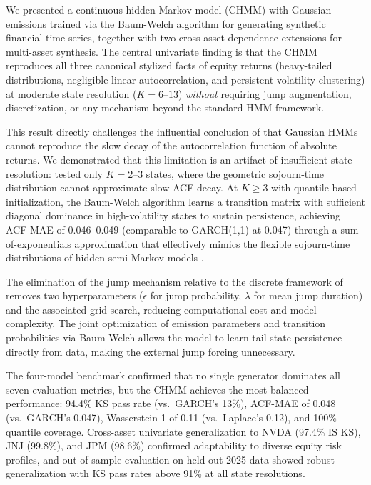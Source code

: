 We presented a continuous hidden Markov model (CHMM) with Gaussian emissions trained via the Baum-Welch algorithm for generating synthetic financial time series, together with two cross-asset dependence extensions for multi-asset synthesis.
The central univariate finding is that the CHMM reproduces all three canonical stylized facts of equity returns (heavy-tailed distributions, negligible linear autocorrelation, and persistent volatility clustering) at moderate state resolution ($K = 6$--$13$) \emph{without} requiring jump augmentation, discretization, or any mechanism beyond the standard HMM framework.

This result directly challenges the influential conclusion of \citet{ryden1998stylized} that Gaussian HMMs cannot reproduce the slow decay of the autocorrelation function of absolute returns.
We demonstrated that this limitation is an artifact of insufficient state resolution: \citet{ryden1998stylized} tested only $K = 2$--$3$ states, where the geometric sojourn-time distribution cannot approximate slow ACF decay.
At $K \geq 3$ with quantile-based initialization, the Baum-Welch algorithm learns a transition matrix with sufficient diagonal dominance in high-volatility states to sustain persistence, achieving ACF-MAE of 0.046--0.049 (comparable to GARCH(1,1) at 0.047) through a sum-of-exponentials approximation that effectively mimics the flexible sojourn-time distributions of hidden semi-Markov models \cite{bulla2006stylized}.

The elimination of the jump mechanism relative to the discrete framework of \citet{alswaidan2026hybrid} removes two hyperparameters ($\epsilon$ for jump probability, $\lambda$ for mean jump duration) and the associated grid search, reducing computational cost and model complexity.
The joint optimization of emission parameters and transition probabilities via Baum-Welch allows the model to learn tail-state persistence directly from data, making the external jump forcing unnecessary.

The four-model benchmark confirmed that no single generator dominates all seven evaluation metrics, but the CHMM achieves the most balanced performance: 94.4\% KS pass rate (vs.\ GARCH's 13\%), ACF-MAE of 0.048 (vs.\ GARCH's 0.047), Wasserstein-1 of 0.11 (vs.\ Laplace's 0.12), and 100\% quantile coverage.
Cross-asset univariate generalization to NVDA (97.4\% IS KS), JNJ (99.8\%), and JPM (98.6\%) confirmed adaptability to diverse equity risk profiles, and out-of-sample evaluation on held-out 2025 data showed robust generalization with KS pass rates above 91\% at all state resolutions.

